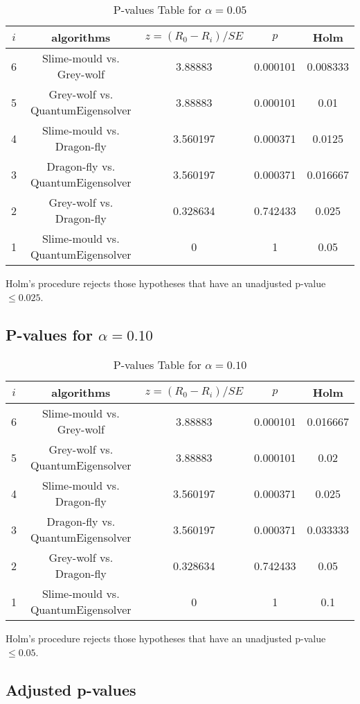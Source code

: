 \documentclass[a4paper,10pt]{article}
\begin{document}
\begin{landscape}
\begin{table}[!htp]
\centering\scriptsize
\begin{tabular}{ccccc}
$i$&algorithms&$z=(R_0 - R_i)/SE$&$p$&Holm\\
\hline6&Slime-mould vs. Grey-wolf&3.88883&0.000101&0.008333\\
5&Grey-wolf vs. QuantumEigensolver&3.88883&0.000101&0.01\\
4&Slime-mould vs. Dragon-fly&3.560197&0.000371&0.0125\\
3&Dragon-fly vs. QuantumEigensolver&3.560197&0.000371&0.016667\\
2&Grey-wolf vs. Dragon-fly&0.328634&0.742433&0.025\\
1&Slime-mould vs. QuantumEigensolver&0&1&0.05\\
\hline
\end{tabular}
\caption{P-values Table for $\alpha=0.05$}
\end{table}Holm's procedure rejects those hypotheses that have an unadjusted p-value $\le0.025$.

\pagebreak

\subsection{P-values for $\alpha=0.10$}

\begin{table}[!htp]
\centering\scriptsize
\begin{tabular}{ccccc}
$i$&algorithms&$z=(R_0 - R_i)/SE$&$p$&Holm\\
\hline6&Slime-mould vs. Grey-wolf&3.88883&0.000101&0.016667\\
5&Grey-wolf vs. QuantumEigensolver&3.88883&0.000101&0.02\\
4&Slime-mould vs. Dragon-fly&3.560197&0.000371&0.025\\
3&Dragon-fly vs. QuantumEigensolver&3.560197&0.000371&0.033333\\
2&Grey-wolf vs. Dragon-fly&0.328634&0.742433&0.05\\
1&Slime-mould vs. QuantumEigensolver&0&1&0.1\\
\hline
\end{tabular}
\caption{P-values Table for $\alpha=0.10$}
\end{table}Holm's procedure rejects those hypotheses that have an unadjusted p-value $\le0.05$.

\pagebreak

\subsection{Adjusted p-values}


\end{landscape}
\end{document}
